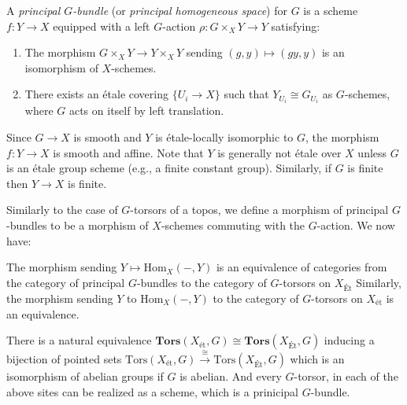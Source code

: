 \begin{definition} A \textit{principal $G$-bundle} (or \textit{principal homogeneous space}) for $G$ is a 
scheme $f : Y \to X$ equipped with a left $G$-action $\rho: G \times_X Y \to Y$ satisfying:
\begin{enumerate}
    \item The morphism $G \times_X Y \to Y \times_X Y$ sending $(g, y) \mapsto (gy, y)$ is an isomorphism of $X$-schemes.
    \item There exists an étale covering $\{U_i \to X\}$ such that $Y_{U_i} \cong G_{U_i}$ as $G$-schemes, 
    where $G$ acts on itself by left translation.
\end{enumerate}
\end{definition}

\begin{rem*}
    Since $G \to X$ is smooth and $Y$ is étale-locally isomorphic to $G$, 
    the morphism $f: Y \to X$ is smooth and affine. Note that $Y$ is generally not étale over $X$ unless $G$ is an 
    étale group scheme (e.g., a finite constant group).
    Similarly, if $G$ is finite then $Y \to X$ is finite.
\end{rem*}

Similarly to the case of $G$-torsors of a topos, we define a morphism of principal $G$-bundles to be a morphism of $X$-schemes commuting with the
$G$-action. We now have:

\begin{theorem}\label{theorem:torsors_are_realized_as_spaces}
    The morphism sending $Y \mapsto \mathrm{Hom}_X(-, Y)$ is an equivalence of categories from the category of principal $G$-bundles 
    to the category of $G$-torsors on $X_{\text{\'Et}}$
    Similarly, the morphism sending $Y$ to $\mathrm{Hom}_X(-, Y)$ to the category of $G$-torsors on $X_{\text{ét}}$ is an equivalence.
\end{theorem}

\begin{cor}
    There is a natural equivalence $\mathbf{Tors}(X_{\mathrm{\text{\'et}}}, G) \cong \mathbf{Tors}(X_{\text{\'Et}}, G)$ 
    inducing a bijection of pointed sets $\mathrm{Tors}(X_{\text{\'et}}, G) \xrightarrow{\cong} \mathrm{Tors}(X_{\text{\'Et}}, G)$ 
    which is an isomorphism of abelian groups if $G$ is abelian.
    And every $G$-torsor, in each of the above sites can be realized as a scheme, which is a prinicipal $G$-bundle.
\end{cor}

